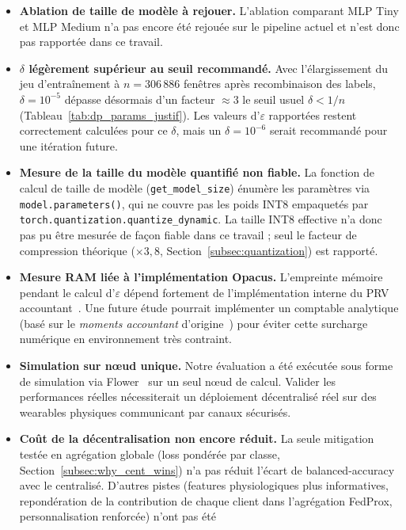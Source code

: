 \documentclass{article}
\begin{document}
\begin{itemize}
  \item \textbf{Ablation de taille de modèle à rejouer.} L'ablation comparant MLP Tiny
  et MLP Medium n'a pas encore été rejouée sur le pipeline actuel et n'est donc pas
  rapportée dans ce travail.
  \item \textbf{$\delta$ légèrement supérieur au seuil recommandé.} Avec
  l'élargissement du jeu d'entraînement à $n = 306\,886$ fenêtres après recombinaison
  des labels, $\delta = 10^{-5}$ dépasse désormais d'un facteur $\approx 3$ le seuil
  usuel $\delta < 1/n$ (Tableau~\ref{tab:dp_params_justif}). Les valeurs
  d'$\varepsilon$ rapportées restent correctement calculées pour ce $\delta$, mais un
  $\delta = 10^{-6}$ serait recommandé pour une itération future.
  \item \textbf{Mesure de la taille du modèle quantifié non fiable.} La fonction de
  calcul de taille de modèle (\texttt{get\_model\_size}) énumère les paramètres via
  \texttt{model.parameters()}, qui ne couvre pas les poids INT8 empaquetés par
  \texttt{torch.quantization.quantize\_dynamic}. La taille INT8 effective n'a donc pas
  pu être mesurée de façon fiable dans ce travail ; seul le facteur de compression
  théorique ($\times 3{,}8$, Section~\ref{subsec:quantization}) est rapporté.
  \item \textbf{Mesure RAM liée à l'implémentation Opacus.} L'empreinte mémoire
  pendant le calcul d'$\varepsilon$ dépend fortement de l'implémentation interne du
  PRV accountant~\cite{opacus}. Une future étude pourrait implémenter un comptable
  analytique (basé sur le \textit{moments accountant} d'origine~\cite{abadi2016deep})
  pour éviter cette surcharge numérique en environnement très contraint.
  \item \textbf{Simulation sur nœud unique.} Notre évaluation a été exécutée sous
  forme de simulation via Flower~\cite{beutel2020flower} sur un seul nœud de calcul.
  Valider les performances réelles nécessiterait un déploiement décentralisé réel sur
  des wearables physiques communicant par canaux sécurisés.
  \item \textbf{Coût de la décentralisation non encore réduit.} La seule mitigation
  testée en agrégation globale (loss pondérée par classe, Section~\ref{subsec:why_cent_wins})
  n'a pas réduit l'écart de balanced-accuracy avec le centralisé. D'autres pistes
  (features physiologiques plus informatives, repondération de la contribution de
  chaque client dans l'agrégation FedProx, personnalisation renforcée) n'ont pas été

\end{itemize}
\end{document}
